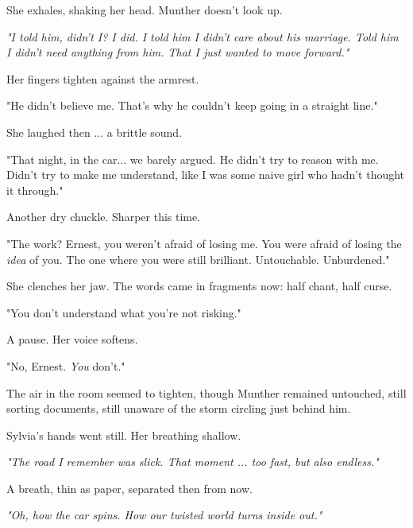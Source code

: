 \bigskip

She exhales, shaking her head. Munther doesn’t look up.

\textit{"I told him, didn’t I? I did. I told him I didn’t care about his marriage. Told him I didn’t need anything from him. That I just wanted to move forward."}

\bigskip

Her fingers tighten against the armrest.

\bigskip

"He didn’t believe me. That’s why he couldn’t keep going in a straight line."

\bigskip

She laughed then ... a brittle sound.

\bigskip

"That night, in the car... we barely argued. He didn’t try to reason with me. Didn’t try to make me understand, like I was some naive girl who hadn’t thought it through."

\bigskip

Another dry chuckle. Sharper this time.

\bigskip

"The work? Ernest, you weren’t afraid of losing me. You were afraid of losing the \textit{idea} of you. The one where you were still brilliant. Untouchable. Unburdened."

\bigskip

She clenches her jaw. The words came in fragments now: half chant, half curse.

\bigskip

"You don’t understand what you’re not risking."

\bigskip

A pause. Her voice softens.

\bigskip

"No, Ernest. \textit{You} don’t."

\bigskip

The air in the room seemed to tighten, though Munther remained untouched, still sorting documents, still unaware of the storm circling just behind him.

\bigskip

Sylvia’s hands went still. Her breathing shallow.

\textit{"The road I remember was slick. That moment ... too fast, but also endless."}

A breath, thin as paper, separated then from now.

\textit{"Oh, how the car spins. How our twisted world turns inside out."}

